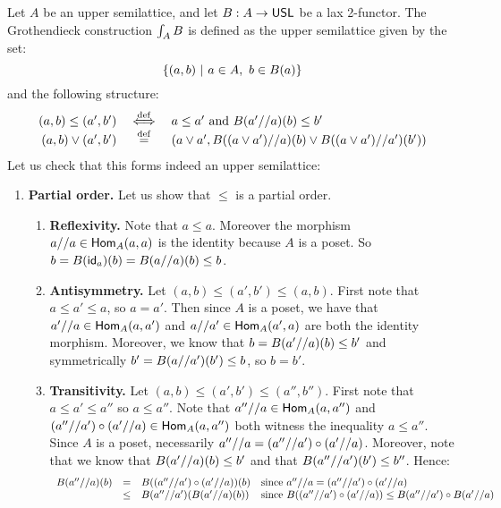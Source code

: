 \begin{definition}
Let $A$ be an upper semilattice, and let $B : A \to \mathsf{USL}$ be a lax 2-functor.
The Grothendieck construction $\int_{A}{B}$
is defined as the upper semilattice given by the
set:
\[
  \{(a,b) \ |\  a \in A,\ b \in B(a)\}
\]
and the following structure:
\[
\begin{array}{rcl}
(a, b) \leq (a', b')    & \overset{\mathrm{def}}{\iff} & a \leq a' \text{ and } B(a'//a)(b) \leq b' \\
(a,b) \lor (a',b')       & \overset{\mathrm{def}}{=} & (a \lor a', B((a \lor a')//a)(b) \lor B((a \lor a')//a')(b')) \\
\end{array}
\]
Let us check that this forms indeed an upper semilattice:
\begin{enumerate}
\item {\bf Partial order.}
  Let us show that $\leq$ is a partial order.
  \begin{enumerate}
  \item {\bf Reflexivity.}
    Note that $a \leq a$. Moreover the morphism $a//a \in \mathsf{Hom}_A(a,a)$ is the identity because $A$ is a poset.
    So $b = B(\mathsf{id}_a)(b) = B(a//a)(b) \leq b$.
  \item {\bf Antisymmetry.}
    Let $(a,b) \leq (a',b') \leq (a,b)$.
    First note that $a \leq a' \leq a$, so $a = a'$.
    Then since $A$ is a poset,
    we have that $a'//a \in \mathsf{Hom}_A(a,a')$ and $a//a' \in \mathsf{Hom}_A(a',a)$ are both the identity morphism.
    Moreover, we know that $b = B(a'//a)(b) \leq b'$
    and symmetrically $b' = B(a//a')(b') \leq b$, so $b = b'$.
  \item {\bf Transitivity.}
    Let $(a,b) \leq (a',b') \leq (a'',b'')$.
    First note that $a \leq a' \leq a''$ so $a \leq a''$.
    Note that $a''//a \in \mathsf{Hom}_A(a,a'')$ and $(a''//a') \circ (a'//a) \in \mathsf{Hom}_A(a,a'')$
    both witness the inequality $a \leq a''$.
    Since $A$ is a poset, necessarily $a''//a = (a''//a') \circ (a'//a)$.
    Moreover, note that we know that $B(a'//a)(b) \leq b'$ and that $B(a''//a')(b') \leq b''$.
    Hence:
    \[
    \begin{array}{rcll}
      B(a''//a)(b)
                  & =    & B((a''//a') \circ (a'//a))(b) & \text{since $a''//a = (a''//a') \circ (a'//a)$} \\
                  & \leq & B(a''//a')(B(a'//a)(b))       & \text{since $B((a''//a') \circ (a'//a)) \leq B(a''//a') \circ B(a'//a)$} \\

\end{array}\]
\end{enumerate}
\end{enumerate}
\end{definition}
